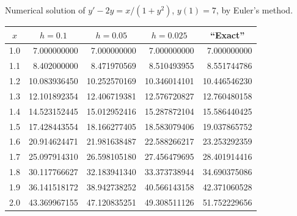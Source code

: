 \begin{examplesolution}
\begin{newtable}
  \label{table:3.1.7} Numerical solution of $y'-2y=x/(1+y^{2})$, $y(1)=7$, by Euler's method.
  \begin{center}
    \begin{tabular}{|c|r|r|r|r|}
      \hline
      \multicolumn{1}{|c|}{$x$} & \multicolumn{1}{|c|}{$h=0.1$} & \multicolumn{1}{|c|}{$h=0.05$} & \multicolumn{1}{|c|}{$h=0.025$} & \multicolumn{1}{|c|}{``Exact''} \\
      \hline
      1.0                       & 7.000000000                   & 7.000000000                    & 7.000000000                     & 7.000000000                     \\
      1.1                       & 8.402000000                   & 8.471970569                    & 8.510493955                     & 8.551744786                     \\
      1.2                       & 10.083936450                  & 10.252570169                   & 10.346014101                    & 10.446546230                    \\
      1.3                       & 12.101892354                  & 12.406719381                   & 12.576720827                    & 12.760480158                    \\
      1.4                       & 14.523152445                  & 15.012952416                   & 15.287872104                    & 15.586440425                    \\
      1.5                       & 17.428443554                  & 18.166277405                   & 18.583079406                    & 19.037865752                    \\
      1.6                       & 20.914624471                  & 21.981638487                   & 22.588266217                    & 23.253292359                    \\
      1.7                       & 25.097914310                  & 26.598105180                   & 27.456479695                    & 28.401914416                    \\
      1.8                       & 30.117766627                  & 32.183941340                   & 33.373738944                    & 34.690375086                    \\
      1.9                       & 36.141518172                  & 38.942738252                   & 40.566143158                    & 42.371060528                    \\
      2.0                       & 43.369967155                  & 47.120835251                   & 49.308511126                    & 51.752229656                    \\
      \hline
    \end{tabular}
  \end{center}
\end{newtable}


\end{examplesolution}
